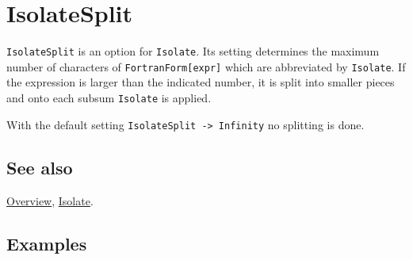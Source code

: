 \documentclass[../FeynCalcManual.tex]{subfiles}
\begin{document}
\hypertarget{isolatesplit}{
\section{IsolateSplit}\label{isolatesplit}}

\texttt{IsolateSplit} is an option for \texttt{Isolate}. Its setting
determines the maximum number of characters of
\texttt{FortranForm[\allowbreak{}expr]} which are abbreviated by
\texttt{Isolate}. If the expression is larger than the indicated number,
it is split into smaller pieces and onto each subsum \texttt{Isolate} is
applied.

With the default setting \texttt{IsolateSplit -> Infinity} no splitting
is done.

\subsection{See also}

\hyperlink{toc}{Overview}, \hyperlink{isolate}{Isolate}.

\subsection{Examples}
\end{document}
